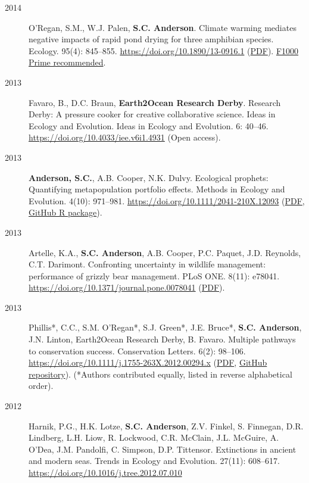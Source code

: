 \begin{description}
\item[2014]
O'Regan, S.M., W.J. Palen, \textbf{S.C. Anderson}. Climate warming
mediates negative impacts of rapid pond drying for three amphibian
species. Ecology. 95(4): 845--855.
\url{https://doi.org/10.1890/13-0916.1}
(\href{http://onlinelibrary.wiley.com/doi/10.1890/13-0916.1/epdf}{PDF}).
\href{https://facultyopinions.com/prime/718498042}{F1000 Prime
recommended}.
\item[2013]
Favaro, B., D.C. Braun, \textbf{Earth2Ocean Research Derby}. Research
Derby: A pressure cooker for creative collaborative science. Ideas in
Ecology and Evolution. Ideas in Ecology and Evolution. 6: 40--46.
\url{https://doi.org/10.4033/iee.v6i1.4931} (Open access).
\item[2013]
\textbf{Anderson, S.C.}, A.B. Cooper, N.K. Dulvy. Ecological prophets:
Quantifying metapopulation portfolio effects. Methods in Ecology and
Evolution. 4(10): 971--981.
\url{https://doi.org/10.1111/2041-210X.12093}
(\href{https://www.dropbox.com/s/7tx1h1pkmmp222j/Anderson_etal_2013_ecological_prophets_with_SOM.pdf?dl=1}{PDF},
\href{https://github.com/seananderson/ecofolio}{GitHub R package}).
\item[2013]
Artelle, K.A., \textbf{S.C. Anderson}, A.B. Cooper, P.C. Paquet, J.D.
Reynolds, C.T. Darimont. Confronting uncertainty in wildlife management:
performance of grizzly bear management. PLoS ONE. 8(11): e78041.
\url{https://doi.org/10.1371/journal.pone.0078041}
(\href{http://www.plosone.org/article/fetchObject.action?uri=info\%3Adoi\%2F10.1371\%2Fjournal.pone.0078041&representation=PDF}{PDF}).
\item[2013]
Phillis*, C.C., S.M. O'Regan*, S.J. Green*, J.E. Bruce*, \textbf{S.C.
Anderson}, J.N. Linton, Earth2Ocean Research Derby, B. Favaro. Multiple
pathways to conservation success. Conservation Letters. 6(2): 98--106.
\url{https://doi.org/10.1111/j.1755-263X.2012.00294.x}
(\href{https://www.dropbox.com/s/cxt848ng5x4hc4t/Phillis_etal_2012_Multiple_pathways_to_conservation_success.pdf?dl=1}{PDF},
\href{https://github.com/seananderson/conservation_pathways}{GitHub
repository}). (*Authors contributed equally, listed in reverse
alphabetical order).
\item[2012]
Harnik, P.G., H.K. Lotze, \textbf{S.C. Anderson}, Z.V. Finkel, S.
Finnegan, D.R. Lindberg, L.H. Liow, R. Lockwood, C.R. McClain, J.L.
McGuire, A. O'Dea, J.M. Pandolfi, C. Simpson, D.P. Tittensor.
Extinctions in ancient and modern seas. Trends in Ecology and Evolution.
27(11): 608--617. \url{https://doi.org/10.1016/j.tree.2012.07.010}

\end{description}
